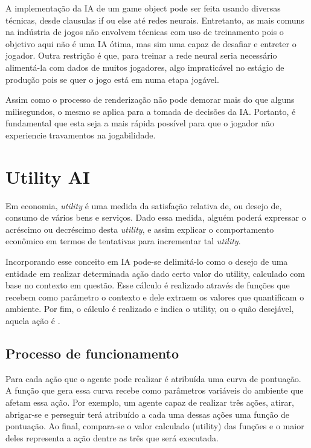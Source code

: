 \documentclass[12pt, 
openright, 
oneside, 
a4paper,    
brazil]{facom-ufu-abntex2}
\begin{document}
A implementação da IA de um game object pode ser feita usando diversas técnicas, desde clausulas if ou else até redes neurais. Entretanto, as mais comuns na indústria de jogos não envolvem técnicas com uso de treinamento pois o objetivo aqui não é uma IA ótima, mas sim uma capaz de desafiar e entreter o jogador. Outra restrição é que, para treinar a rede neural seria necessário alimentá-la com dados de muitos jogadores, algo impraticável no estágio de produção pois se quer o jogo está em numa etapa jogável.

Assim como o processo de renderização não pode demorar mais do que alguns milisegundos, o mesmo se aplica para a tomada de decisões da IA. Portanto, é fundamental que esta seja a mais rápida possível para que o jogador não experiencie travamentos na jogabilidade.

\section{Utility AI}

Em economia, \textit{utility} é uma medida da satisfação relativa de, ou desejo de, consumo de vários bens e serviços. Dado essa medida, alguém poderá expressar o acréscimo ou decréscimo desta \textit{utility}, e assim explicar o comportamento econômico em termos de tentativas para incrementar tal \textit{utility}.

Incorporando esse conceito em IA pode-se delimitá-lo como o desejo de uma entidade em realizar determinada ação dado certo valor do utility, calculado com base no contexto em questão. Esse cálculo é realizado através de funções que recebem como parâmetro o contexto e dele extraem os valores que quantificam o ambiente. Por fim, o cálculo é realizado e indica o utility, ou o quão desejável,  aquela ação é \cite{UtilityAI}.



\subsection{Processo de funcionamento}
Para cada ação que o agente pode realizar é atribuída uma curva de pontuação. A função que gera essa curva recebe como parâmetros variáveis do ambiente que afetam essa ação. Por exemplo, um agente capaz de realizar três ações, atirar, abrigar-se e perseguir terá atribuído a cada uma dessas ações uma função de pontuação. Ao final, compara-se o valor calculado (utility) das funções e o maior deles representa a ação dentre as três que será executada.
\end{document}
